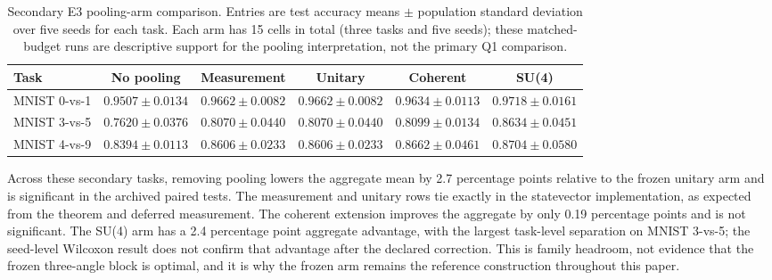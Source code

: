 \documentclass[conference]{IEEEtran}
\begin{document}
\begin{table}[!t]
\caption{Secondary E3 pooling-arm comparison. Entries are test accuracy means $\pm$ population standard deviation over five seeds for each task. Each arm has 15 cells in total (three tasks and five seeds); these matched-budget runs are descriptive support for the pooling interpretation, not the primary Q1 comparison.}
\label{tab:secondary-pooling}
\centering
\small
\begin{tabular}{@{}lccccc@{}}
\toprule
\textbf{Task} & \textbf{No pooling} & \textbf{Measurement} & \textbf{Unitary} & \textbf{Coherent} & \textbf{SU(4)} \\
\midrule
MNIST 0-vs-1 & $0.9507\pm0.0134$ & $0.9662\pm0.0082$ & $0.9662\pm0.0082$ & $0.9634\pm0.0113$ & $0.9718\pm0.0161$ \\
MNIST 3-vs-5 & $0.7620\pm0.0376$ & $0.8070\pm0.0440$ & $0.8070\pm0.0440$ & $0.8099\pm0.0134$ & $0.8634\pm0.0451$ \\
MNIST 4-vs-9 & $0.8394\pm0.0113$ & $0.8606\pm0.0233$ & $0.8606\pm0.0233$ & $0.8662\pm0.0461$ & $0.8704\pm0.0580$ \\
\bottomrule
\end{tabular}
\end{table}

Across these secondary tasks, removing pooling lowers the aggregate mean by
2.7 percentage points relative to the frozen unitary arm and is significant in
the archived paired tests. The measurement and unitary rows tie exactly in the
statevector implementation, as expected from the theorem and deferred
measurement. The coherent extension improves the aggregate by only 0.19
percentage points and is not significant. The SU(4) arm has a 2.4 percentage
point aggregate advantage, with the largest task-level separation on
MNIST 3-vs-5; the seed-level Wilcoxon result does not confirm that advantage
after the declared correction. This is family headroom, not evidence that the
frozen three-angle block is optimal, and it is why the frozen arm remains the
reference construction throughout this paper.
\end{document}
